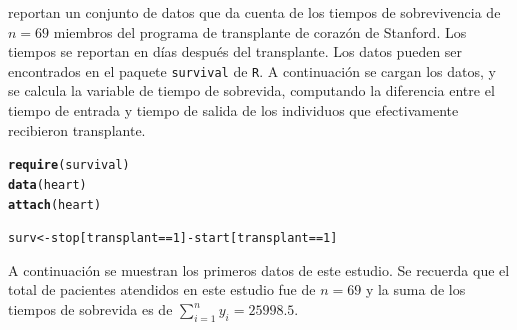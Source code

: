\documentclass[10pt,openright]{book}\usepackage[]{graphicx}\usepackage[]{color}
\makeatletter
\newcommand{\hlnum}[1]{\textcolor[rgb]{0.686,0.059,0.569}{#1}}%
\newcommand{\hlopt}[1]{\textcolor[rgb]{0,0,0}{#1}}%
\newcommand{\hlstd}[1]{\textcolor[rgb]{0.345,0.345,0.345}{#1}}%
\newcommand{\hlkwb}[1]{\textcolor[rgb]{0.69,0.353,0.396}{#1}}%
\newcommand{\hlkwd}[1]{\textcolor[rgb]{0.737,0.353,0.396}{\textbf{#1}}}%
\newenvironment{kframe}{%
 \def\at@end@of@kframe{}%
 \ifinner\ifhmode%
  \def\at@end@of@kframe{\end{minipage}}%
  \begin{minipage}{\columnwidth}%
 \fi\fi%
 \def\FrameCommand##1{\hskip\@totalleftmargin \hskip-\fboxsep
 \colorbox{shadecolor}{##1}\hskip-\fboxsep
     \hskip-\linewidth \hskip-\@totalleftmargin \hskip\columnwidth}%
 \MakeFramed {\advance\hsize-\width
   \@totalleftmargin\z@ \linewidth\hsize
   \@setminipage}}%
 {\par\unskip\endMakeFramed%
 \at@end@of@kframe}
\newenvironment{knitrout}{}{} %
\makeatother
\begin{document}
    \begin{Eje}
     reportan un conjunto de datos que da cuenta de los tiempos de sobrevivencia de $n=69$ miembros del programa de transplante de coraz\'on de Stanford. Los tiempos se reportan en d\'ias despu\'es del transplante. Los datos pueden ser encontrados en el paquete \verb'survival' \cite{survival} de \verb'R'. A continuaci\'on se cargan los datos, y se calcula la variable de tiempo de sobrevida, computando la diferencia entre el tiempo de entrada y tiempo de salida de los individuos que efectivamente recibieron transplante. 
    
\begin{knitrout}
\color{fgcolor}\begin{kframe}
\begin{alltt}
\hlkwd{require}\hlstd{(survival)}
\hlkwd{data}\hlstd{(heart)}
\hlkwd{attach}\hlstd{(heart)}
\end{alltt}


{\ttfamily\noindent\itshape\color{messagecolor}{\#\# The following object is masked from package:survival:\\\#\# \\\#\#\ \ \ \  transplant}}\begin{alltt}
\hlstd{surv} \hlkwb{<-} \hlstd{stop[transplant}\hlopt{==}\hlnum{1}\hlstd{]} \hlopt{-} \hlstd{start[transplant}\hlopt{==}\hlnum{1}\hlstd{]}
\end{alltt}
\end{kframe}
\end{knitrout}
    
    A continuaci\'on se muestran los primeros datos de este estudio. Se recuerda que el total de pacientes atendidos en este estudio fue de $n=69$ y la suma de los tiempos de sobrevida es de $\sum_{i=1}^ny_i=25998.5$.
    

\end{Eje}
\end{document}

